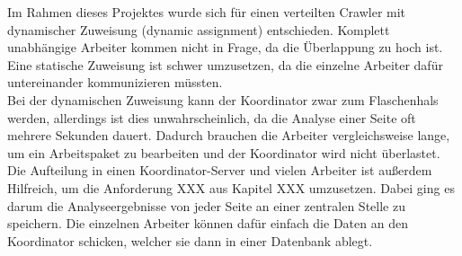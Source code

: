 Im Rahmen dieses Projektes wurde sich für einen verteilten Crawler mit dynamischer Zuweisung (dynamic assignment) entschieden. Komplett unabhängige Arbeiter kommen nicht in Frage, da die Überlappung zu hoch ist. Eine statische Zuweisung ist schwer umzusetzen, da die einzelne Arbeiter dafür untereinander kommunizieren müssten. \\
Bei der dynamischen Zuweisung kann der Koordinator zwar zum Flaschenhals werden, allerdings ist dies unwahrscheinlich, da die Analyse einer Seite oft mehrere Sekunden dauert. Dadurch brauchen die Arbeiter vergleichsweise lange, um ein Arbeitspaket zu bearbeiten und der Koordinator wird nicht überlastet. \\
Die Aufteilung in einen Koordinator-Server und vielen Arbeiter ist außerdem Hilfreich, um die Anforderung XXX aus Kapitel XXX umzusetzen. Dabei ging es darum die Analyseergebnisse von jeder Seite an einer zentralen Stelle zu speichern. Die einzelnen Arbeiter können dafür einfach die Daten an den Koordinator schicken, welcher sie dann in einer Datenbank ablegt.

